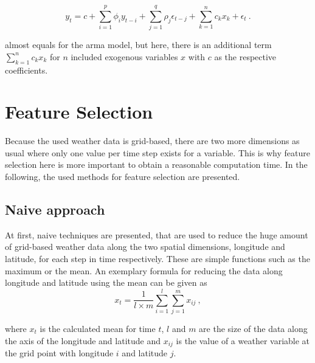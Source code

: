 \begin{equation}
y_t = c+\sum_{i=1}^{p}\phi_iy_{t-i}+\sum_{j=1}^{q}\rho_j\epsilon_{t-j}+\sum_{k=1}^{n}c_kx_k+\epsilon_t~.
\label{eq:armax}
\end{equation}

 almost equals  for the \gls{arma} model, but here, there is an additional term $\sum_{k=1}^{n}c_kx_k$ for $n$ included exogenous variables $x$ with $c$ as the respective coefficients.

%

\section{Feature Selection}
\label{sec:featsel}

Because the used weather data is grid-based, there are two more dimensions as usual where only one value per time step exists for a variable. This is why feature selection here is more important to obtain a reasonable computation time. In the following, the used methods for feature selection are presented.\\

\subsection{Naive approach}

At first, naive techniques are presented, that are used to reduce the huge amount of grid-based weather data along the two spatial dimensions, longitude and latitude, for each step in time respectively. These are simple functions such as the maximum or the mean. An exemplary formula for reducing the data along longitude and latitude using the mean can be given as\\

\begin{equation}
x_t = \frac{1}{l \times m} \sum_{i=1}^{l}\sum_{j=1}^{m}x_{ij}~,
\end{equation}

where $x_t$ is the calculated mean for time $t$, $l$ and $m$ are the size of the data along the axis of the longitude and latitude and $x_{ij}$ is the value of a weather variable at the grid point with longitude $i$ and latitude $j$.

